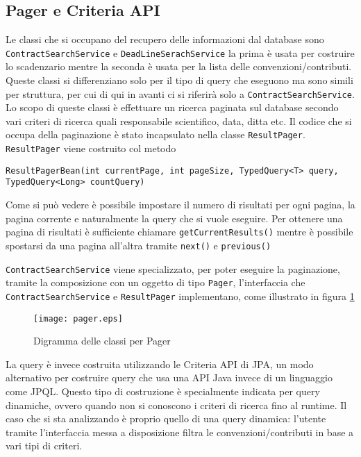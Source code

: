\subsection{Pager e Criteria API}
\label{list_business}
Le classi che si occupano del recupero delle informazioni dal database sono \texttt{ContractSearchService} e \texttt{DeadLineSerachService} la prima è usata per costruire lo scadenzario mentre la seconda è usata per la lista
delle convenzioni/contributi. Queste classi si differenziano solo per il tipo di query che eseguono ma sono simili per struttura, per cui di qui in avanti ci si riferirà solo a \texttt{ContractSearchService}. 
Lo scopo di queste classi è effettuare un ricerca paginata sul database secondo vari criteri di ricerca quali 
responsabile scientifico, data, ditta etc. Il codice che si occupa della paginazione è stato incapsulato nella classe \texttt{ResultPager}. \texttt{ResultPager} viene costruito
col metodo

\begin{lstlisting}
ResultPagerBean(int currentPage, int pageSize, TypedQuery<T> query, TypedQuery<Long> countQuery)
\end{lstlisting}


Come si può vedere è possibile impostare il numero di risultati per ogni pagina, la pagina corrente e naturalmente la query che si vuole eseguire. Per ottenere una pagina di risultati è sufficiente chiamare \lstinline{getCurrentResults()}
mentre è possibile spostarsi da una pagina all'altra tramite \lstinline{next()} e \lstinline{previous()}

\texttt{ContractSearchService} viene specializzato, per poter eseguire la paginazione, tramite la composizione con un oggetto di tipo \texttt{Pager}, l'interfaccia che \texttt{ContractSearchService} e \texttt{ResultPager} implementano, come
illustrato in figura \ref{pager}


\begin{figure}[h]
  \caption{Digramma delle classi per Pager}
  \label{pager}
  \centering
    \texttt{[image: pager.eps]}
\end{figure}

La query è invece costruita utilizzando le Criteria API di JPA, un modo alternativo per costruire query che usa una API Java invece di un linguaggio
come JPQL. Questo tipo di costruzione è specialmente indicata per query dinamiche, ovvero quando non si conoscono i criteri di ricerca fino al runtime.
Il caso che si sta analizzando è proprio quello di una query dinamica: l'utente tramite l'interfaccia messa a disposizione filtra le convenzioni/contributi
in base a vari tipi di criteri.

